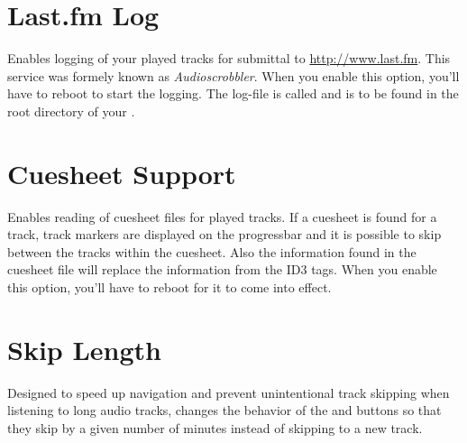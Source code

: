 \section{Last.fm Log}
  Enables logging of your played tracks for submittal to 
  \url{http://www.last.fm}. This service was formely known as 
  \emph{Audioscrobbler}. When you enable this option, you'll have to reboot to
  start the logging. The log-file is called 
  and is to be found in the root directory of your \dap{}.

\section{Cuesheet Support}
  Enables reading of cuesheet files for played tracks. If a cuesheet is found
  for a track, track markers are displayed on the progressbar and it is
  possible to skip between the tracks within the cuesheet. Also the information
  found in the cuesheet file will replace the information from the ID3 tags.
  When you enable this option, you'll have to reboot for it to come into
  effect.
  
\section{Skip Length}
  Designed to speed up navigation and prevent unintentional track skipping when
  listening to long audio tracks,  changes the behavior of
  the \ActionWpsSkipPrev{} and \ActionWpsSkipNext{} buttons so that they skip
  by a given number of minutes instead of skipping to a new track.


